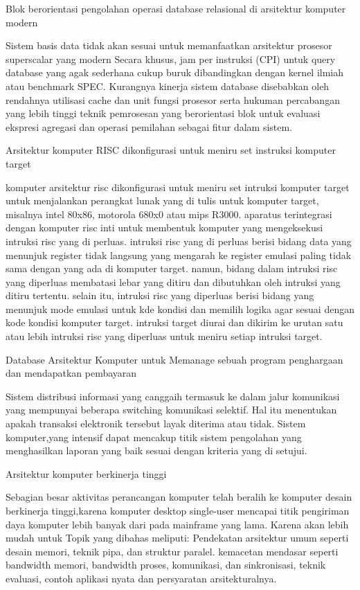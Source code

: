 Blok berorientasi pengolahan operasi database relasional di arsitektur komputer modern

	Sistem basis data tidak  akan sesuai untuk memanfaatkan arsitektur prosesor superscalar  yang modern Secara khusus, jam per instruksi (CPI) untuk query database yang agak sederhana cukup buruk dibandingkan dengan kernel ilmiah atau benchmark SPEC.
Kurangnya kinerja sistem database disebabkan oleh rendahnya utilisasi cache dan unit fungsi prosesor serta hukuman percabangan yang lebih tinggi
teknik pemrosesan yang berorientasi blok untuk evaluasi ekspresi agregasi dan operasi pemilahan sebagai fitur dalam sistem.\cite{padmanabhan2001block}

Arsitektur komputer RISC dikonfigurasi untuk meniru set instruksi komputer target

	komputer arsitektur risc dikonfigurasi untuk meniru set intruksi komputer target untuk menjalankan perangkat lunak yang di tulis untuk komputer target, misalnya intel 80x86, motorola 680x0 atau mips R3000. aparatus terintegrasi dengan komputer risc inti untuk membentuk komputer yang mengeksekusi intruksi risc yang di perluas.
intruksi risc yang di perluas berisi bidang data yang menunjuk register tidak langsung yang mengarah ke register emulasi paling tidak sama dengan yang ada di komputer target. namun, bidang dalam intruksi risc yang diperluas membatasi lebar yang ditiru dan dibutuhkan oleh intruksi yang ditiru tertentu.
selain itu, intruksi risc yang diperluas berisi bidang yang menunjuk mode emulasi untuk kde kondisi dan memilih logika agar sesuai dengan kode kondisi komputer target. intruksi target diurai dan dikirim ke urutan satu atau lebih intruksi risc yang diperluas untuk meniru setiap intruksi target.\cite{scantlin1996risc}

Database Arsitektur Komputer untuk Memanage sebuah program penghargaan dan mendapatkan pembayaran

	Sistem distribusi informasi yang canggaih termasuk ke dalam jalur komunikasi yang mempunyai beberapa switching komunikasi selektif. Hal itu menentukan apakah transaksi elektronik tersebut layak diterima atau tidak.
Sistem komputer,yang intensif dapat mencakup titik sistem pengolahan yang menghasilkan laporan yang baik sesuai dengan kriteria yang di setujui.\cite{robinson1998database}

Arsitektur komputer berkinerja tinggi

	Sebagian besar aktivitas perancangan komputer telah beralih ke komputer desain berkinerja tinggi,karena komputer desktop single-user mencapai titik pengiriman daya komputer lebih banyak dari pada mainframe yang lama.
Karena akan lebih mudah untuk Topik yang dibahas meliputi: Pendekatan arsitektur umum seperti desain memori, teknik pipa, dan struktur paralel. kemacetan mendasar seperti bandwidth memori, bandwidth proses, komunikasi, dan sinkronisasi, teknik evaluasi, contoh aplikasi nyata dan persyaratan arsitekturalnya.\cite{stone1987high}

